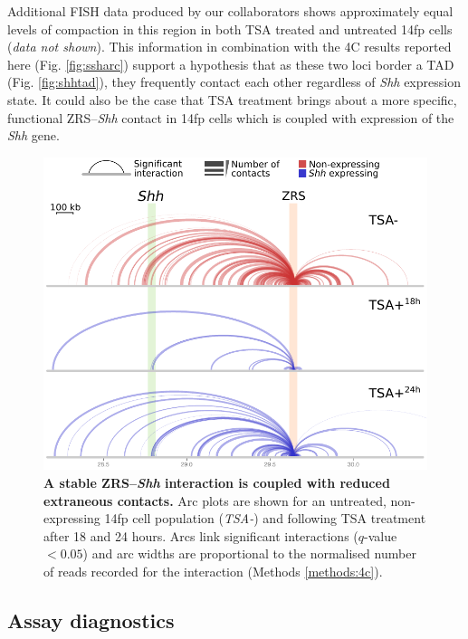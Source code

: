 \documentclass[a4paper,11pt,oneside]{book}
\begin{document}
Additional FISH data produced by our collaborators shows approximately equal levels of compaction in this region in both TSA treated and untreated 14fp cells (\emph{data not shown}). This information in combination with the 4C results reported here (Fig. \ref{fig:ssharc}) support a hypothesis that as these two loci border a TAD (Fig. \ref{fig:shhtad}), they frequently contact each other regardless of \emph{Shh} expression state. It could also be the case that TSA treatment brings about a more specific, functional ZRS--\emph{Shh} contact in 14fp cells which is coupled with expression of the \emph{Shh} gene.

\begin{figure}
\begin{center} 
\includegraphics[width=4.6in]{figs/4cArcs_v2.pdf}
\captionsetup{width=\textwidth} 
\caption[ A stable ZRS--\emph{Shh} interaction is coupled with reduced extraneous contacts. ]{ {\bf A stable ZRS--\emph{Shh} interaction is coupled with reduced extraneous contacts. }
Arc plots are shown for an untreated, non-expressing 14fp cell population (\emph{TSA-}) and following TSA treatment after 18 and 24 hours. Arcs link significant interactions ($q$-value $< 0.05$) and arc widths are proportional to the normalised number of reads recorded for the interaction (Methods \ref{methods:4c}).
}\label{fig:4carcs}
\end{center} 
\end{figure} 

\subsection{Assay diagnostics}
\end{document}
